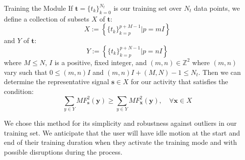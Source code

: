 \documentclass[unknownkeysallowed,final]{beamer}
\begin{document}
\begin{frame}{}
\begin{textblock}{17.3}
\begin{block}{\small{Training the Module}}
If $\textbf{t} = \{t_k\}_{k=0}^{N_t}$ is our training set over $N_t$ data points, we define a collection of subsets $X$ of $\textbf{t}$:
%
\begin{equation} \label{eq:X_subsets_of_training_eq}
X := \left \{ \{t_k\}_{k=p}^{p+M-1} | p=mI \right \}
\end{equation}
%
and $Y$ of $\textbf{t}$:
%
\begin{equation} \label{eq:Y_subsets_of_training_eq}
Y := \left \{ \{t_k\}_{k=p}^{p+N-1} | p=nI \right \}
\end{equation}
%
where $M \leq N$, $I$ is a positive, fixed integer, and $(m,n) \in \mathbb{Z}^2$ where $(m,n)$ vary such that $0 \leq (m,n)I$ and $(m,n)I + (M,N) - 1 \leq N_t$. Then we can determine the representative signal $\textbf{s} \in X$ for our activity that satisfies the condition:
%
\begin{equation} \label{eq:s_condition}
\sum_{y \in Y}MF^2_{\textbf{s}}(\textbf{y}) \geq \sum_{y \in Y}MF^2_{\textbf{x}}(\textbf{y}), \quad \forall \textbf{x} \in X
\end{equation}

We chose this method for its simplicity and robustness against outliers in our training set. We anticipate that the user will have idle motion at the start and end of their training duration when they activate the training mode and with possible disruptions during the process.

\end{block}


\end{textblock}
\end{frame}
\end{document}
